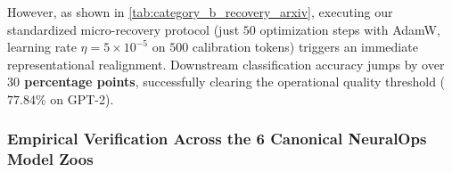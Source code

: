 However, as shown in \cref{tab:category_b_recovery_arxiv}, executing our standardized micro-recovery protocol (just $50$ optimization steps with AdamW, learning rate $\eta = 5 \times 10^{-5}$ on $500$ calibration tokens) triggers an immediate representational realignment. Downstream classification accuracy jumps by over \textbf{$30$ percentage points}, successfully clearing the operational quality threshold ($77.84\%$ on GPT-2).

\begin{table}[t]
\centering
\small
\caption[Category B Logit Discrepancy Recovery Under 50-Step Micro-Tuning on GPT-2]{\textbf{Category B Logit Discrepancy Recovery Under 50-Step Micro-Tuning on GPT-2.} Evaluated on non-softmax attention formulations displaying initial zero-shot logit differences $\Delta > 8.0$. A rapid 50-step fine-tuning pass ($\eta = 5 \times 10^{-5}$) heals the output distribution, yielding an average accuracy recovery $>30\%$.}
\label{tab:category_b_recovery_arxiv}
\end{table}

\subsubsection{Empirical Verification Across the 6 Canonical NeuralOps Model Zoos}
\label{sec:results_six_zoos_verification}

